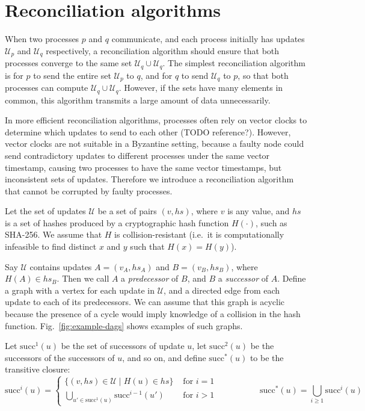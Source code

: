 \documentclass[manuscript,anonymous]{acmart}
\begin{document}
\section{Reconciliation algorithms}\label{sec:algorithm}

When two processes $p$ and $q$ communicate, and each process initially has updates $\mathcal{U}_p$ and $\mathcal{U}_q$ respectively, a reconciliation algorithm should ensure that both processes converge to the same set $\mathcal{U}_q \cup \mathcal{U}_q$.
The simplest reconciliation algorithm is for $p$ to send the entire set $\mathcal{U}_p$ to $q$, and for $q$ to send $\mathcal{U}_q$ to $p$, so that both processes can compute $\mathcal{U}_q \cup \mathcal{U}_q$.
However, if the sets have many elements in common, this algorithm transmits a large amount of data unnecessarily.

In more efficient reconciliation algorithms, processes often rely on vector clocks to determine which updates to send to each other (TODO reference?).
However, vector clocks are not suitable in a Byzantine setting, because a faulty node could send contradictory updates to different processes under the same vector timestamp, causing two processes to have the same vector timestamps, but inconsistent sets of updates.
Therefore we introduce a reconciliation algorithm that cannot be corrupted by faulty processes.

Let the set of updates $\mathcal{U}$ be a set of pairs $(v, \mathit{hs})$, where $v$ is any value, and $\mathit{hs}$ is a set of hashes produced by a cryptographic hash function $H(\cdot)$, such as SHA-256.
We assume that $H$ is collision-resistant (i.e.\ it is computationally infeasible to find distinct $x$ and $y$ such that $H(x) = H(y)$).

Say $\mathcal{U}$ contains updates $A = (v_A, \mathit{hs}_A)$ and $B = (v_B, \mathit{hs}_B)$, where $H(A) \in \mathit{hs}_B$.
Then we call $A$ a \emph{predecessor} of $B$, and $B$ a \emph{successor} of $A$.
Define a graph with a vertex for each update in $\mathcal{U}$, and a directed edge from each update to each of its predecessors.
We can assume that this graph is acyclic because the presence of a cycle would imply knowledge of a collision in the hash function.
Fig.~\ref{fig:example-dags} shows examples of such graphs.

Let $\mathrm{succ}^1(u)$ be the set of successors of update $u$, let $\mathrm{succ}^2(u)$ be the successors of the successors of $u$, and so on, and define $\mathrm{succ}^*(u)$ to be the transitive closure:
\[
\mathrm{succ}^i(u) =
\begin{cases}
\{( v, \mathit{hs}) \in \mathcal{U} \mid H(u) \in \mathit{hs}\} & \text{ for } i=1 \\
\bigcup_{u' \in \mathrm{succ}^1(u)} \mathrm{succ}^{i-1}(u') & \text{ for } i>1
\end{cases}
\hspace{60pt}
\mathrm{succ}^*(u) = \bigcup_{i \ge 1} \mathrm{succ}^i(u)
\]
\end{document}
